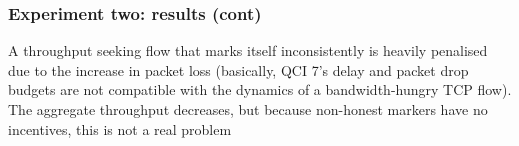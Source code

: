 \begin{frame}
\frametitle{Experiment two: results (cont)}

A throughput seeking flow that marks itself inconsistently is heavily penalised due to the increase in packet loss (basically, QCI 7's delay and packet drop budgets are not compatible with the dynamics of a bandwidth-hungry TCP flow). The aggregate throughput decreases, but because non-honest markers have no incentives, this is not a real problem

\end{frame}
